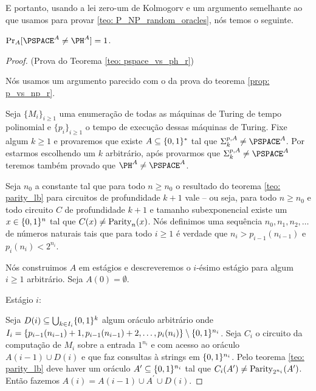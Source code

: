 E portanto, usando a lei zero-um de Kolmogorv e um argumento semelhante ao que usamos para provar \ref{teo: P_NP_random_oracles}, nós temos o seguinte.

\begin{teo} \label{teo: pspace_vs_ph_random}

$\Pr_{A}[\PSPACE^{A} \neq \PH^{A}] = 1$.

\end{teo}

\begin{proof} (Prova do Teorema \ref{teo: pspace_vs_ph_r})

Nós usamos um argumento parecido com o da prova do teorema \ref{prop: p_vs_np_r}.

Seja $\{M_{i}\}_{i \geq 1}$ uma enumeração de todas as máquinas de Turing de tempo polinomial e $\{p_{i}\}_{i \geq 1}$ o tempo de execução dessas máquinas de Turing. Fixe algum $k \geq 1$ e provaremos que existe $A \subseteq \{0, 1\}^{*}$ tal que $\Sigma_{k}^{p, A} \neq \PSPACE^{A}$. Por estarmos escolhendo um $k$ arbitrário, após provarmos que $\Sigma_{k}^{p, A} \neq \PSPACE^{A}$ teremos também provado que $\PH^{A} \neq \PSPACE^{A}$.

Seja $n_{0}$ a constante tal que para todo $n \geq n_{0}$ o resultado do teorema \ref{teo: parity_lb} para circuitos de profundidade $k + 1$ vale -- ou seja, para todo $n \geq n_{0}$ e todo circuito $C$ de profundidade $k + 1$ e tamanho subexponencial existe um $x \in \{0, 1\}^{n}$ tal que $C(x) \neq \text{Parity}_{n}(x)$. Nós definimos uma sequência $n_{0}, n_{1}, n_{2}, \dots$ de números naturais tais que para todo $i \geq 1$ é verdade que $n_{i} > p_{i - 1}(n_{i - 1})$ e $p_{i}(n_{i}) < 2^{n_{i}}$.

Nós construimos $A$ em estágios e descreveremos o $i$-ésimo estágio para algum $i \geq 1$ arbitrário. Seja $A(0) = \emptyset$.

Estágio $i$:

Seja $D(i) \subseteq \bigcup_{k \in I_{i}} \{0, 1\}^{k}$ algum oráculo arbitrário onde $I_{i} = \{p_{i - 1}(n_{i - 1}) + 1, p_{i - 1}(n_{i - 1}) + 2, \dots, p_{i}(n_{i}) \} \setminus \{0, 1\}^{n_{i}}$. Seja $C_{i}$ o circuito da computação de $M_{i}$ sobre a entrada $1^{n_{i}}$ e com acesso ao oráculo $A(i - 1) \cup D(i)$ e que faz consultas à strings em $\{0, 1\}^{n_{i}}$. Pelo teorema \ref{teo: parity_lb} deve haver um oráculo $A^{\prime} \subseteq \{0, 1\}^{n_{i}}$ tal que $C_{i}(A^{\prime}) \neq \text{Parity}_{2^{n_{i}}}(A^{\prime})$. Então fazemos $A(i) = A(i - 1) \cup A^{\prime} \cup D(i)$.


\end{proof}
